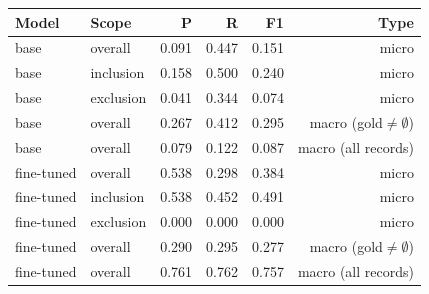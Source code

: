 \begin{tabular}{llrrrr}\toprule
Model & Scope & P & R & F1 & Type \\\midrule
base & overall & 0.091 & 0.447 & 0.151 & micro \\
base & inclusion & 0.158 & 0.500 & 0.240 & micro \\
base & exclusion & 0.041 & 0.344 & 0.074 & micro \\
base & overall & 0.267 & 0.412 & 0.295 & macro (gold$\neq\emptyset$) \\
base & overall & 0.079 & 0.122 & 0.087 & macro (all records) \\\midrule
fine-tuned & overall & 0.538 & 0.298 & 0.384 & micro \\
fine-tuned & inclusion & 0.538 & 0.452 & 0.491 & micro \\
fine-tuned & exclusion & 0.000 & 0.000 & 0.000 & micro \\
fine-tuned & overall & 0.290 & 0.295 & 0.277 & macro (gold$\neq\emptyset$) \\
fine-tuned & overall & 0.761 & 0.762 & 0.757 & macro (all records) \\\bottomrule\end{tabular}
